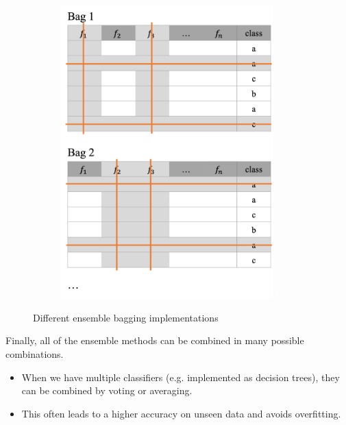 \begin{figure}[h]
\begin{subfigure}{0.32\textwidth}
    \includegraphics[width=0.9\textwidth]{assets/trees/id3/ensemble_comb_bagging.png}
    \textcolor{white}{\footnotesize test }
  \end{subfigure}
  \caption{Different ensemble bagging implementations}
  \label{fig:3_bagging}
\end{figure}

Finally, all of the ensemble methods can be combined in many possible combinations. 
\begin{itemize}
  \item When we have multiple classifiers (e.g. implemented as decision trees), they can be combined by voting or averaging.
  \item This often leads to a higher accuracy on unseen data and avoids overfitting.
\end{itemize}

